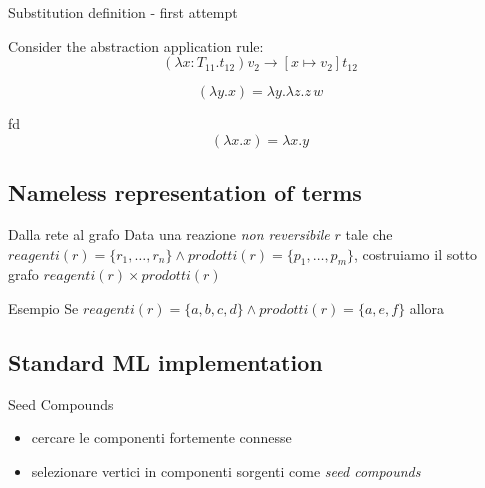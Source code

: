 \documentclass[8pt]{beamer}
\begin{document}
\begin{frame}{Substitution definition - first attempt}

    Consider the abstraction application rule:
    \begin{displaymath}
        (\lambda x:T_{11}.t_{12})v_{2} \rightarrow [x \mapsto v_{2}]t_{12}
    \end{displaymath}

    \begin{example}
        \begin{displaymath}
                [x \mapsto (\lambda z. z\, w)](\lambda y.x) =
                     \lambda y.\lambda z.z\, w 
        \end{displaymath}
    \end{example}

    \begin{alertblock}{fd}
        \begin{displaymath}
                [x \mapsto y](\lambda x.x) = \lambda x.y 
        \end{displaymath}
    \end{alertblock}
\end{frame}

\subsection{Nameless representation of terms}

\begin{frame}{Dalla rete al grafo}
  Data una reazione \emph{non reversibile} $r$ tale che $reagenti(r) =
  \{ r_{1}, \ldots, r_{n} \} \wedge prodotti(r) = \{ p_{1}, \ldots,
  p_{m} \}$, costruiamo il sotto grafo $reagenti(r) \times
  prodotti(r)$
    \begin{block}{Esempio}
      Se $reagenti(r) = \{ a, b, c, d \} \wedge prodotti(r) = \{a, e,
      f\}$ allora
    \end{block}
\end{frame}

\subsection{Standard ML implementation}
\begin{frame}{Seed Compounds}
  \begin{itemize}
  \item cercare le componenti fortemente connesse
  \item selezionare vertici in componenti sorgenti come \emph{seed
      compounds}
  \end{itemize}

\end{frame}
\end{document}
